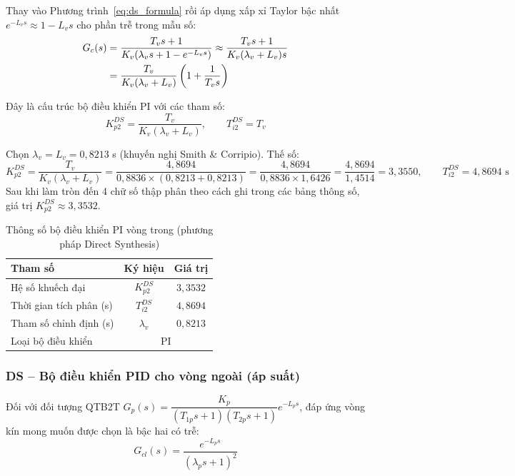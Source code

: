 \documentclass[../main.tex]{subfiles}
\begin{document}
Thay vào Phương trình~\ref{eq:ds_formula} rồi áp dụng xấp xỉ Taylor bậc nhất $e^{-L_v s} \approx 1 - L_v s$ cho phần trễ trong mẫu số:
\begin{align}
    G_{c}(s) &= \frac{T_v s + 1}{K_v(\lambda_v s + 1 - e^{-L_v s})} \approx \frac{T_v s + 1}{K_v(\lambda_v + L_v)s} \notag \\
    &= \frac{T_v}{K_v(\lambda_v + L_v)} \left(1 + \frac{1}{T_v s}\right)
    \label{eq:ds_pi_inner}
\end{align}

Đây là cấu trúc bộ điều khiển PI với các tham số:
\begin{equation}
    K_{p2}^{DS} = \frac{T_v}{K_v (\lambda_v + L_v)}, \qquad T_{i2}^{DS} = T_v
    \label{eq:ds_pi_params_inner}
\end{equation}

Chọn $\lambda_v = L_v = 0{,}8213$ s (khuyến nghị Smith \& Corripio). Thế số:
\[
K_{p2}^{DS} = \frac{T_v}{K_v (\lambda_v + L_v)} = \frac{4{,}8694}{0{,}8836 \times (0{,}8213 + 0{,}8213)} = \frac{4{,}8694}{0{,}8836 \times 1{,}6426} = \frac{4{,}8694}{1{,}4514} = 3{,}3550, \qquad T_{i2}^{DS} = 4{,}8694 \text{ s}
\]
Sau khi làm tròn đến 4 chữ số thập phân theo cách ghi trong các bảng thông số, giá trị $K_{p2}^{DS} \approx 3{,}3532$.

\begin{table}[H]
\centering
\caption{Thông số bộ điều khiển PI vòng trong (phương pháp Direct Synthesis)}
\label{tab:tham_so_pi_van_ds}
\begin{tabular}{|l|c|c|}
\hline
\textbf{Tham số} & \textbf{Ký hiệu} & \textbf{Giá trị}\\ \hline
Hệ số khuếch đại & $K_{p2}^{DS}$ & $3{,}3532$\\ \hline
Thời gian tích phân (s) & $T_{i2}^{DS}$ & $4{,}8694$\\ \hline
Tham số chỉnh định (s) & $\lambda_v$ & $0{,}8213$\\ \hline
Loại bộ điều khiển & \multicolumn{2}{c|}{PI}\\ \hline
\end{tabular}
\end{table}

\subsubsection{DS -- Bộ điều khiển PID cho vòng ngoài (áp suất)}

Đối với đối tượng QTB2T $G_p(s) = \dfrac{K_p}{(T_{1p}s+1)(T_{2p}s+1)}e^{-L_p s}$, đáp ứng vòng kín mong muốn được chọn là bậc hai có trễ:
\begin{equation}
    G_{cl}(s) = \frac{e^{-L_p s}}{(\lambda_p s + 1)^2}
    \label{eq:ds_cl_sopdt}
\end{equation}
\end{document}
